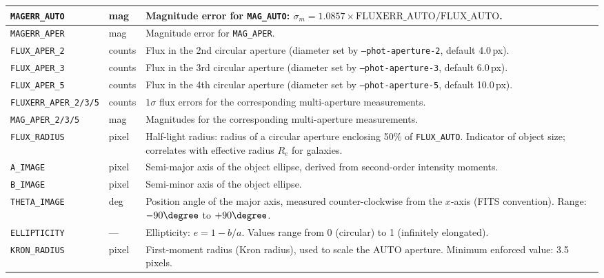 \documentclass[11pt,fleqn]{book}
\begin{document}
\begin{center}
\begin{longtable}{L{3.2cm} C{1.8cm} L{7.5cm}}
\texttt{MAGERR\_AUTO} & mag & Magnitude error for \texttt{MAG\_AUTO}: $\sigma_m = 1.0857 \times \text{FLUXERR\_AUTO} / \text{FLUX\_AUTO}$. \\
\midrule

\texttt{MAGERR\_APER} & mag & Magnitude error for \texttt{MAG\_APER}. \\
\midrule

\texttt{FLUX\_APER\_2} & counts & Flux in the 2nd circular aperture (diameter set by \texttt{--phot-aperture-2}, default 4.0\,px). \\
\midrule

\texttt{FLUX\_APER\_3} & counts & Flux in the 3rd circular aperture (diameter set by \texttt{--phot-aperture-3}, default 6.0\,px). \\
\midrule

\texttt{FLUX\_APER\_5} & counts & Flux in the 4th circular aperture (diameter set by \texttt{--phot-aperture-5}, default 10.0\,px). \\
\midrule

\texttt{FLUXERR\_APER\_2/3/5} & counts & $1\sigma$ flux errors for the corresponding multi-aperture measurements. \\
\midrule

\texttt{MAG\_APER\_2/3/5} & mag & Magnitudes for the corresponding multi-aperture measurements. \\
\midrule

\texttt{FLUX\_RADIUS} & pixel & Half-light radius: radius of a circular aperture enclosing 50\% of \texttt{FLUX\_AUTO}. Indicator of object size; correlates with effective radius $R_e$ for galaxies. \\
\midrule

\texttt{A\_IMAGE} & pixel & Semi-major axis of the object ellipse, derived from second-order intensity moments. \\
\midrule

\texttt{B\_IMAGE} & pixel & Semi-minor axis of the object ellipse. \\
\midrule

\texttt{THETA\_IMAGE} & deg & Position angle of the major axis, measured counter-clockwise from the $x$-axis (FITS convention). Range: $-90\degree$ to $+90\degree$. \\
\midrule

\texttt{ELLIPTICITY} & --- & Ellipticity: $e = 1 - b/a$. Values range from 0 (circular) to 1 (infinitely elongated). \\
\midrule

\texttt{KRON\_RADIUS} & pixel & First-moment radius (Kron radius), used to scale the AUTO aperture. Minimum enforced value: 3.5 pixels. \\
\midrule


\end{longtable}
\end{center}
\end{document}
